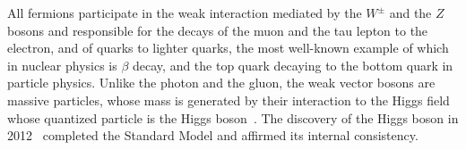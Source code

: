 All fermions participate in the weak interaction mediated by the $W^{\pm}$ and the $Z$ bosons and responsible for the decays of the muon and the tau lepton to the electron, and of quarks to lighter quarks, the most well-known example of which in nuclear physics is $\beta$ decay, and the top quark decaying to the bottom quark in particle physics. 
Unlike the photon and the gluon, the weak vector bosons are massive particles, whose mass is generated by their interaction to the Higgs field whose quantized particle is the Higgs boson~\cite{Higgs-PhysRev.145.1156,Higgs-PhysRevLett.13.508,HIGGS1964132,Englert-brout-PhysRevLett.13.321,Guralnik-PhysRevLett.13.585,Kibble-PhysRev.155.1554}. 
The discovery of the Higgs boson in 2012~\cite{HIGG-2012-27,CMS-HIG-12-028} completed the Standard Model and affirmed its internal consistency. 

